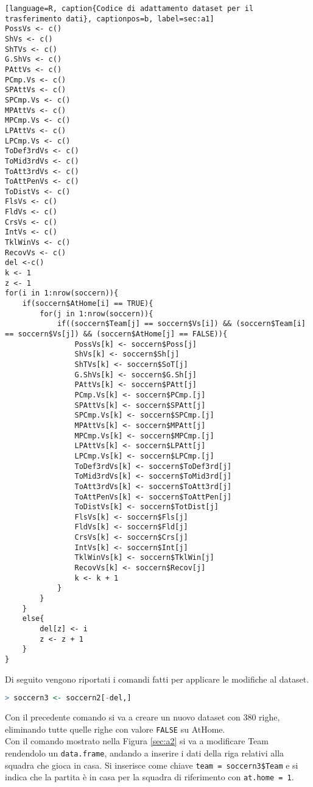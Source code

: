 \begin{lstlisting}[language=R, caption{Codice di adattamento dataset per il trasferimento dati}, captionpos=b, label=sec:a1]
PossVs <- c()
ShVs <- c()
ShTVs <- c()
G.ShVs <- c()
PAttVs <- c()
PCmp.Vs <- c()
SPAttVs <- c()
SPCmp.Vs <- c()
MPAttVs <- c()
MPCmp.Vs <- c()
LPAttVs <- c()
LPCmp.Vs <- c()
ToDef3rdVs <- c()
ToMid3rdVs <- c()
ToAtt3rdVs <- c()
ToAttPenVs <- c()
ToDistVs <- c()
FlsVs <- c()
FldVs <- c()
CrsVs <- c()
IntVs <- c()
TklWinVs <- c()
RecovVs <- c()
del <-c()
k <- 1
z <- 1
for(i in 1:nrow(soccern)){
	if(soccern$AtHome[i] == TRUE){
		for(j in 1:nrow(soccern)){
			if((soccern$Team[j] == soccern$Vs[i]) && (soccern$Team[i] == soccern$Vs[j]) && (soccern$AtHome[j] == FALSE)){
				PossVs[k] <- soccern$Poss[j]
				ShVs[k] <- soccern$Sh[j]
				ShTVs[k] <- soccern$SoT[j]
				G.ShVs[k] <- soccern$G.Sh[j]
				PAttVs[k] <- soccern$PAtt[j]
				PCmp.Vs[k] <- soccern$PCmp.[j]
				SPAttVs[k] <- soccern$SPAtt[j]
				SPCmp.Vs[k] <- soccern$SPCmp.[j]
				MPAttVs[k] <- soccern$MPAtt[j]
				MPCmp.Vs[k] <- soccern$MPCmp.[j]
				LPAttVs[k] <- soccern$LPAtt[j]
				LPCmp.Vs[k] <- soccern$LPCmp.[j]
				ToDef3rdVs[k] <- soccern$ToDef3rd[j]
				ToMid3rdVs[k] <- soccern$ToMid3rd[j]
				ToAtt3rdVs[k] <- soccern$ToAtt3rd[j]
				ToAttPenVs[k] <- soccern$ToAttPen[j]
				ToDistVs[k] <- soccern$TotDist[j]
				FlsVs[k] <- soccern$Fls[j]
				FldVs[k] <- soccern$Fld[j]
				CrsVs[k] <- soccern$Crs[j]
				IntVs[k] <- soccern$Int[j]
				TklWinVs[k] <- soccern$TklWin[j]
				RecovVs[k] <- soccern$Recov[j]
				k <- k + 1
			}      
		}
	}
	else{
		del[z] <- i
		z <- z + 1
	}
}
\end{lstlisting}
\bigskip
Di seguito vengono riportati i comandi fatti per applicare le modifiche al dataset.
\bigskip
\begin{lstlisting}[language=R]
	> soccern3 <- soccern2[-del,]
\end{lstlisting}
\bigskip
Con il precedente comando si va a creare un nuovo dataset con 380 righe, eliminando tutte quelle righe con valore \texttt{FALSE} su \textsf{AtHome}. \\

Con il comando mostrato nella Figura \ref{sec:a2} si va a modificare \textsf{Team} rendendolo un \texttt{data.frame}, andando a inserire i dati della riga relativi alla squadra che gioca in casa. Si inserisce come chiave \texttt{team = soccern3\$Team} e si indica che la partita è in casa per la squadra di riferimento con \texttt{at.home = 1}.\\

